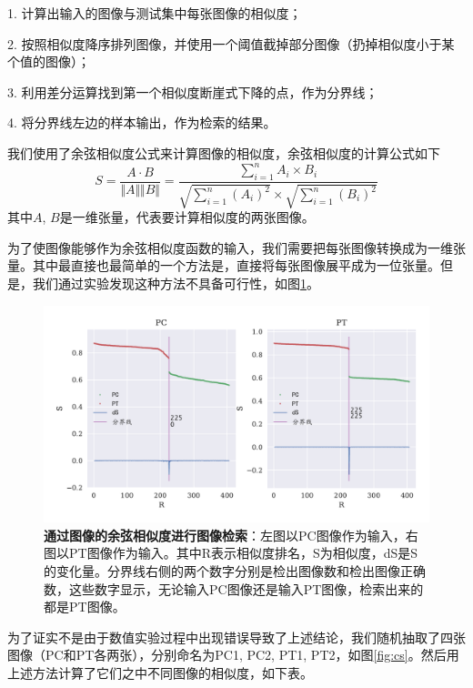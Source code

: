 1. 计算出输入的图像与测试集中每张图像的相似度；

2. 按照相似度降序排列图像，并使用一个阈值截掉部分图像（扔掉相似度小于某个值的图像）；

3. 利用差分运算找到第一个相似度断崖式下降的点，作为{\Heiti 分界线}；

4. 将分界线左边的样本输出，作为检索的结果。

我们使用了余弦相似度公式来计算图像的相似度，余弦相似度的计算公式如下
\begin{equation}\label{equ:CosineSimilarity}
S = \frac{A \cdot B}{\Vert A\Vert \Vert B \Vert} = \frac{\sum\limits_{i=1}^{n} A_i \times B_i}{\sqrt{\sum\limits_{i=1}^{n} (A_i)^2} \times \sqrt{\sum\limits_{i=1}^{n} (B_i)^2}}
\end{equation}
其中$A$, $B$是一维张量，代表要计算相似度的两张图像。

为了使图像能够作为余弦相似度函数的输入，我们需要把每张图像转换成为一维张量。其中最直接也最简单的一个方法是，直接将每张图像展平成为一位张量。但是，我们通过实验发现这种方法不具备可行性，如图\ref{fig:rcs}。

\begin{figure}[H]
	\centering
	\includegraphics[width=\linewidth]{../figures/retrieval/2.pdf}
	\caption{\textbf{通过图像的余弦相似度进行图像检索}：左图以PC图像作为输入，右图以PT图像作为输入。其中R表示相似度排名，S为相似度，dS是S的变化量。分界线右侧的两个数字分别是检出图像数和检出图像正确数，这些数字显示，无论输入PC图像还是输入PT图像，检索出来的都是PT图像。}
	\label{fig:rcs}
\end{figure}

为了证实不是由于数值实验过程中出现错误导致了上述结论，我们随机抽取了四张图像（PC和PT各两张），分别命名为PC1, PC2, PT1, PT2，如图\ref{fig:cs}。然后用上述方法计算了它们之中不同图像的相似度，如下表。

